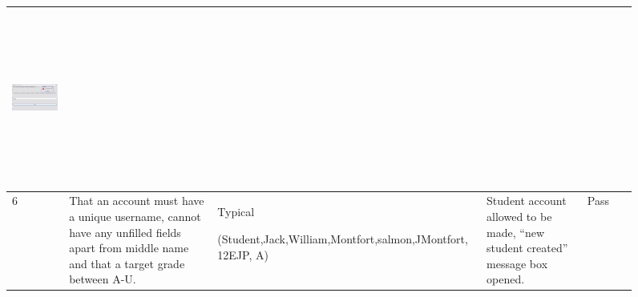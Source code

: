 \documentclass[letterpaper]{article}
\begin{document}
\begin{figure}[hbp]
\begin{minipage}{12.1146in}
\begin{flushleft}
\begin{supertabular}{|m{0.8913598in}|m{1.0997599in}|m{3.3018599in}|m{0.8809598in}|m{0.6198598in}|m{4.84626in}|}
{\includegraphics[width=3.9374in,height=2.2709in]{Tests_files/image010.jpg} }\\\hline
{\color{black} 6} &
{\color{black} That an account must have a unique username, cannot have any unfilled fields apart from middle name and
that a target grade between A-U.} &
{\color{black} Typical}

{\color{black} (Student,Jack,William,Montfort,salmon,JMontfort, 12EJP, A)} &
{\color{black} Student account allowed to be made, ``new student created'' message box opened.} &
{\color{black} Pass} &
{\color{black} ~}


\end{supertabular}
\end{flushleft}
\end{minipage}
\end{figure}
\end{document}
